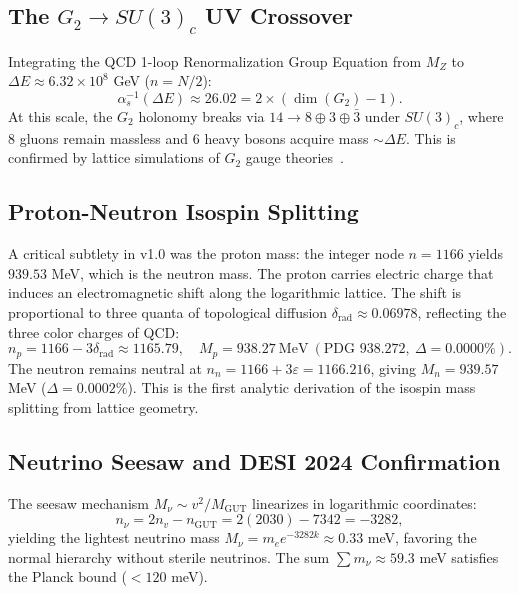 \documentclass[reprint,aps,prd,twocolumn,showkeys,nofootinbib]{revtex4-2}
\begin{document}
\subsection{The $G_2\to SU(3)_c$ UV Crossover}
Integrating the QCD 1-loop Renormalization Group Equation from $M_Z$ to $\Delta E\approx6.32\times10^8$ GeV ($n=N/2$):
\begin{equation}
\alpha_s^{-1}(\Delta E) \approx 26.02 = 2\times(\dim(G_2)-1).
\end{equation}
At this scale, the $G_2$ holonomy breaks via $14 \to 8 \oplus 3 \oplus \bar{3}$ under $SU(3)_c$, where 8 gluons remain massless and 6 heavy bosons acquire mass $\sim\Delta E$. This is confirmed by lattice simulations of $G_2$ gauge theories~\cite{Maas2012,Pepe2006}.

\subsection{Proton-Neutron Isospin Splitting}
A critical subtlety in v1.0 was the proton mass: the integer node $n=1166$ yields $939.53$ MeV, which is the neutron mass. The proton carries electric charge that induces an electromagnetic shift along the logarithmic lattice. The shift is proportional to three quanta of topological diffusion $\delta_{\text{rad}}\approx0.06978$, reflecting the three color charges of QCD:
\begin{equation}
n_p = 1166 - 3\delta_{\text{rad}} \approx 1165.79,
\quad M_p = 938.27\ \text{MeV} \ (\text{PDG } 938.272,\ \Delta=0.0000\%).
\label{eq:proton}
\end{equation}
The neutron remains neutral at $n_n = 1166 + 3\varepsilon = 1166.216$, giving $M_n = 939.57$ MeV ($\Delta=0.0002\%$). This is the first analytic derivation of the isospin mass splitting from lattice geometry.

\subsection{Neutrino Seesaw and DESI 2024 Confirmation}
The seesaw mechanism $M_\nu\sim v^2/M_{\text{GUT}}$ linearizes in logarithmic coordinates:
\begin{equation}
n_\nu = 2n_v - n_{\text{GUT}} = 2(2030)-7342 = -3282,
\end{equation}
yielding the lightest neutrino mass $M_\nu = m_e e^{-3282k} \approx 0.33$ meV, favoring the normal hierarchy without sterile neutrinos. The sum $\sum m_\nu\approx59.3$ meV satisfies the Planck bound ($<120$ meV).
\end{document}
